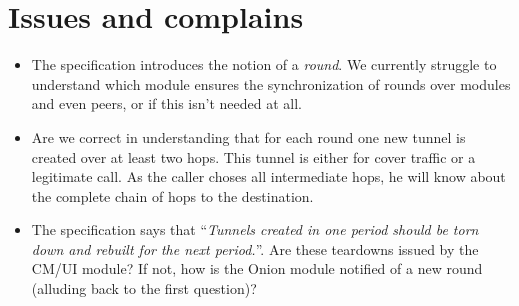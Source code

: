 \documentclass[paper=letter, fontsize=12pt]{article}
\begin{document}
\section{Issues and complains}
\begin{itemize}
\item The specification introduces the notion of a \emph{round}. We currently struggle to understand which module ensures the synchronization of rounds over modules and even peers, or if this isn't needed at all.

\item Are we correct in understanding that for each round one new tunnel is created over at least two hops. This tunnel is either for cover traffic or a legitimate call. As the caller choses all intermediate hops, he will know about the complete chain of hops to the destination. 

\item The specification says that \enquote{\emph{Tunnels created in one period should be torn down and rebuilt for the next period.}}. Are these teardowns issued by the CM/UI module? If not, how is the Onion module notified of a new round (alluding back to the first question)?
\end{itemize}

\end{document}
